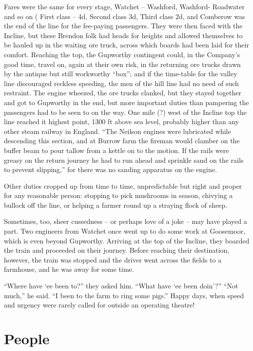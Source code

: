 \documentclass[11pt]{book}
\begin{document}
Fares were the same for every stage, Watchet – Washford, Washford- Roadwater and so on ( First class – 4d, Second class 3d, Third class 2d, and Comberow was the end of the line for the fee-paying passengers.  They were then faced with the Incline, but these Brendon folk had heads for heights and allowed themselves to be hauled up in the waiting ore truck, across which boards had been laid for their comfort. Reaching the top, the Gupworthy contingent could, in the Company’s good time, travel on, again at their own risk, in the returning ore trucks drawn by the antique but still workworthy “box”; and if the time-table for the valley line discouraged reckless speeding,  the men of the hill line had no need of such restraint. The engine wheezed, the ore trucks clanked, but they stayed together and got to Gupworthy in the end, but more important duties than pampering the  passengers had to be seen to on the way. One mile (?)  west of the Incline top the line reached it highest point, 1300 ft above sea level, probably higher than any other steam railway in England. “The Neilson engines were lubricated while descending this section, and at Burrow farm the fireman would clamber on the buffer beam to pour tallow from a kettle on to the motion. If the rails were greasy on the return journey he had to run ahead and sprinkle sand on the rails to prevent slipping,” for there was no sanding apparatus on the engine.


Other duties cropped up from time to time, unpredictable but right and proper for any reasonable person:  stopping to pick mushrooms in season, chivying a bullock off the line, or helping a farmer round up a straying flock of sheep.

Sometimes, too, sheer cussedness – or perhaps love of a joke – may have played a part. Two engineers from Watchet once went up to do some work at Goosemoor, which is even beyond Gupworthy. Arriving at the top of the Incline, they boarded the train and proceeded on their journey. Before reaching their destination, however, the train was stopped and the driver went across the fields to a farmhouse, and he was away for some time.

  “Where have ‘ee been to?” they asked him. “What have ‘ee been doin’?”
  “Not much,” he said. “I been to the farm to ring some pigs.”
      Happy days, when speed and urgency were rarely called for outside an operating theatre! 
      
\chapter{People}    
\end{document}
